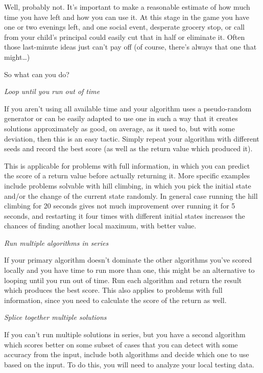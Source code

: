 Well, probably not. It's important to make a reasonable estimate of how
much time you have left and how you can use it. At this stage in the
game you have one or two evenings left, and one social event, desperate
grocery stop, or call from your child's principal could easily cut that
in half or eliminate it. Often those last-minute ideas just can't pay
off (of course, there's always that one that might\ldots{})

So what can you do?

\emph{Loop until you run out of time}

If you aren't using all available time and your algorithm uses a
pseudo-random generator or can be easily adapted to use one in such a
way that it creates solutions approximately as good, on average, as it
used to, but with some deviation, then this is an easy tactic. Simply
repeat your algorithm with different seeds and record the best score (as
well as the return value which produced it).

This is applicable for problems with full information, in which you can
predict the score of a return value before actually returning it. More
specific examples include problems solvable with hill climbing, in which
you pick the initial state and/or the change of the current state
randomly. In general case running the hill climbing for 20 seconds gives
not much improvement over running it for 5 seconds, and restarting it
four times with different initial states increases the chances of
finding another local maximum, with better value.

\emph{Run multiple algorithms in series}

If your primary algorithm doesn't dominate the other algorithms you've
scored locally and you have time to run more than one, this might be an
alternative to looping until you run out of time. Run each algorithm and
return the result which produces the best score. This also applies to
problems with full information, since you need to calculate the score of
the return as well.

\emph{Splice together multiple solutions}

If you can't run multiple solutions in series, but you have a second
algorithm which scores better on some subset of cases that you can
detect with some accuracy from the input, include both algorithms and
decide which one to use based on the input. To do this, you will need to
analyze your local testing data.

